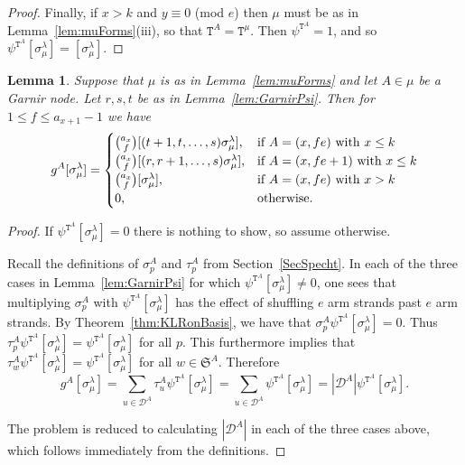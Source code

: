 \documentclass[twoside,11pt,reqno,letter]{amsart}
\numberwithin{equation}{section}
\newtheorem{Lemma}[equation]{Lemma}
\theoremstyle{definition}  %
\newcommand{\0}{{\bar 0}}
\newcommand{\1}{{\bar 1}}
\newcommand{\la}{\lambda}
\def\Si{\mathfrak{S}}
\newcommand{\si}{\sigma}
\newcommand{\D}{{\mathscr D}}
\def\T{{\mathtt T}}
\begin{document}
{\begin{proof}
  Finally, if  $x > k$ and $y \equiv 0$ (mod $e$) then $\mu$ must be as in Lemma~\ref{lem:muForms}(iii), so that $\T^A = \T^\mu$. Then $\psi^{\T^A}=1$, and so $\psi^{\T^A} [\si^\la_\mu] = [\si^\la_\mu]$.
\end{proof}









\begin{Lemma}\label{lem:GarnirRel}
  Suppose that $\mu$ is as in Lemma~\ref{lem:muForms} and let $A \in \mu$ be a Garnir node. Let $r, s, t$ be as in Lemma~\ref{lem:GarnirPsi}. Then for $1 \leq f \leq a_{x+1}-1$ we have
  \[
    g^A [\si^\la_\mu] = \begin{cases}
      \binom{a_x}{f} [(t+1, t, \dots, s) \si^\la_\mu],& \textup{if $A = (x, fe)$ with $x \leq k$} \\
      \binom{a_x}{f} [(r, r+1, \dots, s) \si^\la_\mu],& \textup{if $A = (x, fe + 1)$ with $x \leq k$}\\
      \binom{a_x}{f} [\si^\la_\mu],& \textup{if $A = (x, fe)$ with $x > k$}\\
      0,& \textup{otherwise}.
    \end{cases}
  \]
\end{Lemma}

\begin{proof}
  If $\psi^{\T^A} [\si^\la_\mu] = 0$ there is nothing to show, so assume otherwise.

  Recall the definitions of $\si^A_p$ and $\tau^A_p$ from Section~\ref{SecSpecht}. In each of the three cases in Lemma~\ref{lem:GarnirPsi} for which $\psi^{\T^A} [\si^\la_\mu] \neq 0$, one sees that multiplying $\si^A_p$ with $\psi^{\T^A} [\si^\la_\mu]$ has the effect of shuffling $e$ arm strands past $e$ arm strands. By Theorem~\ref{thm:KLRonBasis}, we have that $\si^A_p \psi^{\T^A} [\si^\la_\mu] = 0$. Thus $\tau^A_p \psi^{\T^A} [\si^\la_\mu] = \psi^{\T^A} [\si^\la_\mu]$ for all $p$. This furthermore implies that $\tau^A_w \psi^{\T^A} [\si^\la_\mu] = \psi^{\T^A} [\si^\la_\mu]$ for all $w \in \Si^A$. Therefore
\[
  g^A [\si^\la_\mu] = \sum_{u \in \D^A} \tau^A_u \psi^{\T^A} [\si^\la_\mu]
             = \sum_{u \in \D^A} \psi^{\T^A} [\si^\la_\mu]
             = \left| \D^A \right| \psi^{\T^A} [\si^\la_\mu].
\]

The problem is reduced to calculating $\left| \D^A \right|$ in each of the three cases above, which follows immediately from the definitions.
\end{proof}









}
\end{document}
